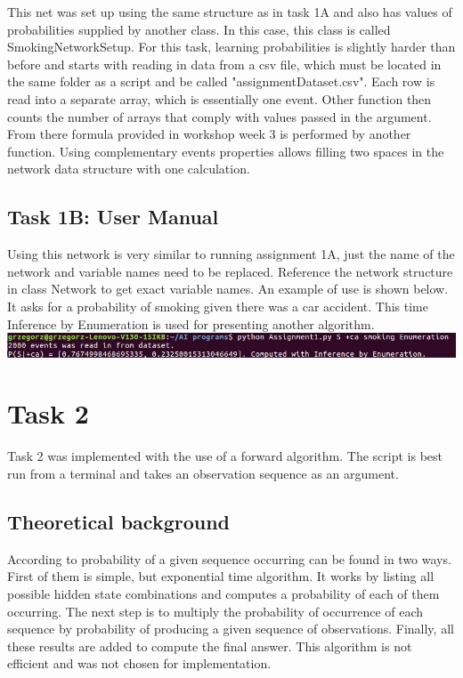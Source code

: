 \documentclass[10pt]{article}
\begin{document}
This net was set up using the same structure as in task 1A and also has values of probabilities supplied by another class. In this case, this class is called SmokingNetworkSetup. For this task, learning probabilities is slightly harder than before and starts with reading in data from a csv file, which must be located in the same folder as a script and be called "assignmentDataset.csv". Each row is read into a separate array, which is essentially one event. Other function then counts the number of arrays that comply with values passed in the argument. From there formula provided in workshop week 3 \citep{Workshop3} is performed by another function. Using complementary events properties allows filling two spaces in the network data structure with one calculation.

\subsection{Task 1B: User Manual}
Using this network is very similar to running assignment 1A, just the name of the network and variable names need to be replaced. Reference the network structure in class Network to get exact variable names. An example of use is shown below. It asks for a probability of smoking given there was a car accident. This time Inference by Enumeration is used for presenting another algorithm.
\includegraphics[width=\textwidth]{UserManual2.jpg}

\section{Task 2}
Task 2 was implemented with the use of a forward algorithm. The script is best run from a terminal and takes an observation sequence as an argument.

\subsection{Theoretical background}
According to \cite{bookA} probability of a given sequence occurring can be found in two ways. First of them is simple, but exponential time algorithm. It works by listing all possible hidden state combinations and computes a probability of each of them occurring. The next step is to multiply the probability of occurrence of each sequence by probability of producing a given sequence of observations. Finally, all these results are added to compute the final answer. This algorithm is not efficient and was not chosen for implementation. 
\end{document}
